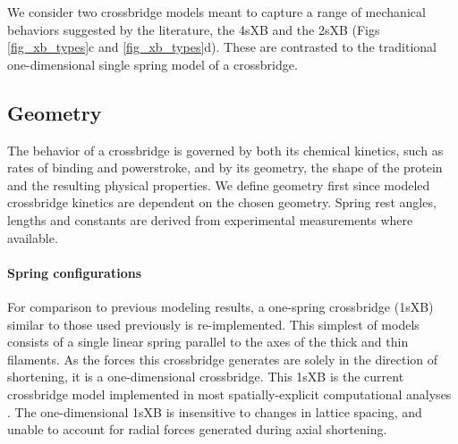 \documentclass[]{article}
\begin{document}
We consider two crossbridge models meant to capture a range of mechanical behaviors suggested by the literature, the 4sXB and the 2sXB (Figs \ref{fig_xb_types}c and \ref{fig_xb_types}d).  
These are contrasted to the traditional one-dimensional single spring model of a crossbridge.

\subsection*{Geometry} %

The behavior of a crossbridge is governed by both its chemical kinetics, such as rates of binding and powerstroke, and by its geometry, the shape of the protein and the resulting physical properties.
We define geometry first since modeled crossbridge kinetics are dependent on the chosen geometry.
Spring rest angles, lengths and constants are derived from experimental measurements where available.

\paragraph{Spring configurations} %
For comparison to previous modeling results, a one-spring crossbridge (1sXB) similar to those used previously is re-implemented.
This simplest of models consists of a single linear spring parallel to the axes of the thick and thin filaments.
As the forces this crossbridge generates are solely in the direction of shortening, it is a one-dimensional crossbridge. 
This 1sXB is the current crossbridge model implemented in most spatially-explicit computational analyses \citep{Daniel1998, Chase:2004:p204, Tanner:2007:pe115}. 
The one-dimensional 1sXB is insensitive to changes in lattice spacing, and unable to account for radial forces generated during axial shortening.
\end{document}
